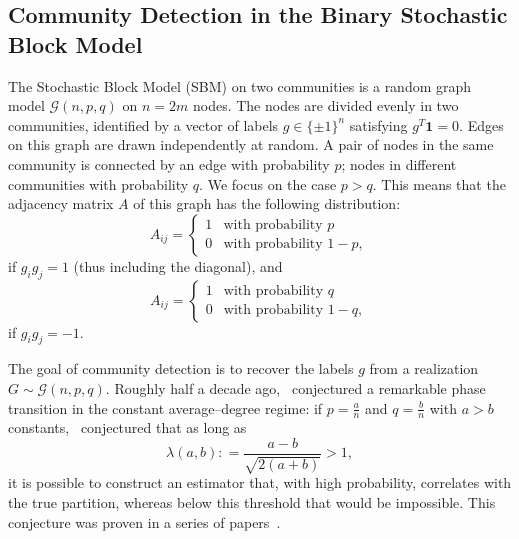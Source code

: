 \documentclass{colt2016} %
\newcommand{\1}{\mathbf{1}}
\newcommand{\GGG}{\mathcal{G}}
\newcommand{\TODO}[1]{{\color{red}{[#1]}}}
\newcommand{\defeq}{\mathrel{\mathop:}=}
\begin{document}
\subsection{Community Detection in the Binary Stochastic Block Model}

The Stochastic Block Model (SBM) on two communities is a random graph model
$\GGG(n,p,q)$ on $n=2m$ nodes. The nodes are divided evenly in two
communities, identified by a vector of labels $g\in\{\pm1\}^n$ satisfying $g^T\1=0$.
Edges on this graph are drawn independently at
random. A pair of nodes in the same community is connected by an edge
with probability $p$; nodes in different communities with probability
$q$. We focus on the case $p>q$. This means that the adjacency
matrix $A$ of this graph has the following distribution:
\[
 A_{ij} = \left\{ \begin{array}{ll} 1 & \text{with probability } p \\
0 & \text{with probability } 1-p, \end{array} \right.
\]
if $g_ig_j = 1$ (thus including the diagonal), and
\[
 A_{ij} = \left\{ \begin{array}{ll} 1 & \text{with probability } q \\
0 & \text{with probability } 1-q, \end{array} \right.
\]
if $g_ig_j = -1$. %

The goal of community detection is to recover the labels $g$ from a
realization $G\sim\GGG(n,p,q)$. Roughly half a decade
ago,~\cite{Decelle_SBM} conjectured a remarkable phase transition in
the constant average--degree regime: if $p = \frac{a}n$ and $q =
\frac{b}n$ with $a>b$ constants,~\cite{Decelle_SBM} conjectured that
as long as
\begin{equation}\label{eq:condition:partialrecovery:SBM}
\lambda(a,b) \defeq \frac{a-b}{\sqrt{2(a+b)}} > 1,
\end{equation}
it is possible to construct an estimator that, with high probability,
correlates with the true partition, whereas below this threshold that would be impossible. This conjecture was proven in a series of
papers~\citep{Mossel_SBM1,Mossel_SBM2,Massoulie_SBM}.
\end{document}
